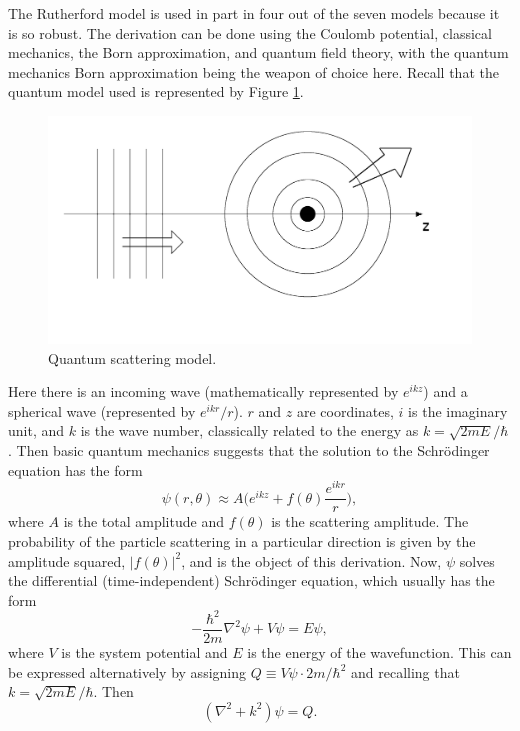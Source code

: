 The Rutherford model is used in part in four out of the seven models because it is so robust. The derivation can be done using the Coulomb potential, classical mechanics, the Born approximation, and quantum field theory, with the quantum mechanics Born approximation being the weapon of choice here. Recall that the quantum model used is represented by Figure \ref{fig:qmscatteringmodel}.
\begin{figure}
  \centering
    \includegraphics[width=\textwidth]{Figures/scattering_model_2} 
  \caption{Quantum scattering model.}
  \label{fig:qmscatteringmodel}
\end{figure}
Here there is an incoming wave (mathematically represented by $e^{ikz}$) and a spherical wave (represented by $e^{ikr}/r$). $r$ and $z$ are coordinates, $i$ is the imaginary unit, and $k$ is the wave number, classically related to the energy as $k=\sqrt{2mE}/\hbar$. Then basic quantum mechanics suggests that the solution to the Schr\"{o}dinger equation has the form
\begin{equation}
\label{eqn:scatteringwavefunction}
\psi (r,\theta)\approx A \big(e^{ikz}+f(\theta)\frac{e^{ikr}}{r}\big),
\end{equation}
where $A$ is the total amplitude and $f(\theta)$ is the scattering amplitude. The probability of the particle scattering in a particular direction is given by the amplitude squared, $|f(\theta)|^2$, and is the object of this derivation. Now, $\psi$ solves the differential (time-independent) Schr\"{o}dinger equation, which usually has the form
\begin{equation} \nonumber
-\frac{\hbar^2}{2m}\nabla^2\psi+V\psi=E\psi,
\end{equation}
where $V$ is the system potential and $E$ is the energy of the wavefunction. This can be expressed alternatively by assigning $Q\equiv V\psi\cdot{2m}/{\hbar^2}$ and recalling that $k=\sqrt{2mE}/\hbar$. Then
%
\begin{equation}
\label{eqn:schrodinger}
(\nabla^2+k^2)\psi=Q.
\end{equation}

